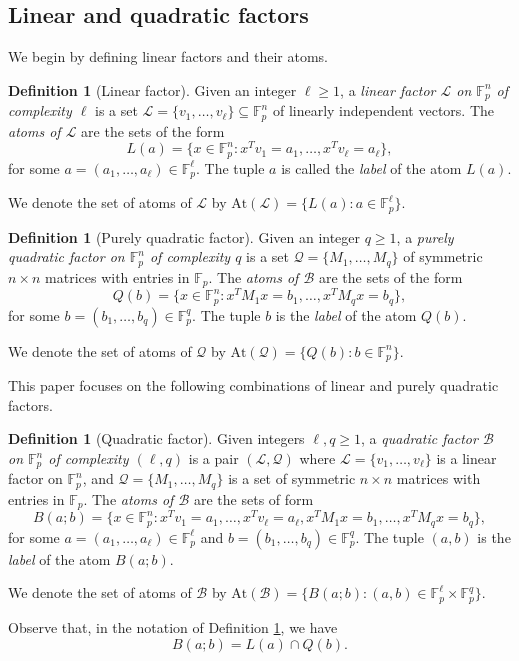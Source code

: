 \documentclass[12pt,oneside,british,a4wide]{amsart}
\numberwithin{equation}{section}
\theoremstyle{definition}
\newtheorem{definition}[theorem]{Definition}
\def\F{\mathbb{F}}
\newcommand{\calL}{\mathcal{L}}
\newcommand{\calB}{\mathcal{B}}
\newcommand{\calQ}{\mathcal{Q}}
\newcommand{\At}{{\mathrm{At}}}
\begin{document}
\subsection{Linear and quadratic factors}

We begin by defining linear factors and their atoms.


\begin{definition}[Linear factor]\label{def:linfac}
Given an integer $\ell\geq 1$, a \emph{linear factor $\calL$ on $\F_p^n$ of complexity $\ell$} is a set $\calL=\{v_1,\ldots, v_{\ell}\}\subseteq \F_p^n$ of linearly independent vectors. The \emph{atoms of $\calL$} are the sets of the  form
$$
L(a)=\{x\in \F_p^n: x^T v_1=a_1,\ldots, x^T v_{\ell}=a_{\ell}\},
$$
for some $a=(a_1,\ldots, a_{\ell})\in \F_p^{\ell}$.
The tuple $a$ is called the \emph{label} of the atom $L(a)$. 

We denote the set of atoms of $\calL$ by $\At(\calL)=\{L(a): a\in \F_p^{\ell}\}$.
\end{definition}
  




\begin{definition}[Purely quadratic factor]\label{def:quadfac}
Given an integer $q\geq 1$, a \emph{purely quadratic factor on $\F_p^n$ of complexity $q$} is a set $\calQ=\{M_1,\ldots, M_q\}$ of symmetric $n\times n$ matrices with entries in $\F_p$.  The \emph{atoms of $\calB$} are the sets of the form 
$$
Q(b)=\{x\in \F_p^n: x^TM_1x=b_1,\ldots, x^TM_qx=b_q\},
$$
for some $b=(b_1,\ldots, b_q)\in \F_p^q$.  The tuple $b$ is the \emph{label} of the atom $Q(b)$. 

We denote the set of atoms of $\calQ$ by $\At(\calQ)=\{Q(b): b\in \F_p^n\}$. 
\end{definition}

 

This paper focuses on the following combinations of linear and purely quadratic factors.

\begin{definition}[Quadratic factor]\label{def:quadfac}
Given integers $\ell,q\geq 1$, a \emph{quadratic factor $\calB$ on $\F_p^n$ of complexity $(\ell,q)$} is a pair $(\calL,\calQ)$ where $\calL=\{v_1,\ldots, v_{\ell}\}$ is a linear factor on $\F_p^n$, and $\calQ=\{M_1,\ldots, M_q\}$ is a set of symmetric $n\times n$ matrices with entries in $\F_p$.  The \emph{atoms of $\calB$} are the sets of form 
$$
B(a;b)=\{x\in \F_p^n: x^T v_1=a_1,\ldots, x^T v_{\ell}=a_{\ell}, x^TM_1x=b_1,\ldots, x^TM_qx=b_q\},
$$
for some $a=(a_1,\ldots, a_{\ell})\in \F_p^{\ell}$ and $b=(b_1,\ldots, b_q)\in \F_p^q$. The tuple $(a,b)$ is the \emph{label} of the atom $B(a;b)$. 

 We denote the set of atoms of $\calB$ by  $\At(\calB)=\{B(a;b): (a,b)\in \F_p^{\ell}\times \F_p^q\}$.
\end{definition}
Observe that, in the notation of Definition \ref{def:quadfac}, we have 
$$
B(a;b)=L(a)\cap Q(b).
$$
\end{document}
